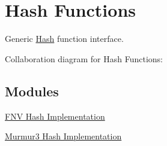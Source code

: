 \hypertarget{group__hash}{}\section{Hash Functions}
\label{group__hash}


Generic \hyperlink{namespacens3_1_1Hash}{Hash} function interface.  


Collaboration diagram for Hash Functions\+:
\subsection*{Modules}
\begin{DoxyCompactItemize}
\item 
\hyperlink{group__hash__fnv}{F\+N\+V Hash Implementation}
\item 
\hyperlink{group__hash__murmur3}{Murmur3 Hash Implementation}
\end{DoxyCompactItemize}
